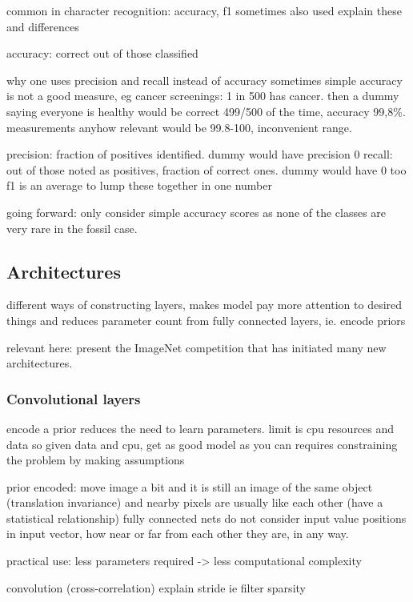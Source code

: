 \documentclass{article}
\begin{document}
common in character recognition: accuracy, f1 sometimes also used 
explain these and differences 

accuracy: correct out of those classified

why one uses precision and recall instead of accuracy
sometimes simple accuracy is not a good measure, eg cancer screenings: 1 in 500 has cancer.
then a dummy saying everyone is healthy would be correct 499/500 of the time, accuracy
99,8\%. measurements anyhow relevant would be 99.8-100, inconvenient range.

precision: fraction of positives identified. dummy would have precision 0
recall: out of those noted as positives, fraction of correct ones. dummy would have 0 too 
f1 is an average to lump these together in one number 

going forward: only consider simple accuracy scores as none of the classes are very rare 
in the fossil case.

\subsection{Architectures}

different ways of constructing layers, makes model pay more attention to desired things 
and reduces parameter count from fully connected layers, ie. encode priors \cite{alexnet}

relevant here: present the ImageNet competition that has initiated many new architectures.

\subsubsection{Convolutional layers}


encode a prior reduces the need to learn parameters. limit is cpu resources and data so given data 
and cpu, get as good model as you can requires constraining the problem by making assumptions \cite{alexnet}

prior encoded: move image a bit and it is still an image of the same object (translation invariance)
and nearby pixels are usually like each other (have a statistical relationship) fully connected nets 
do not consider input value positions in input vector, how near or far from each other they are, in any way.
\cite{princebook}

practical use: less parameters required -> less computational complexity

convolution (cross-correlation)
explain stride ie filter sparsity
\end{document}

